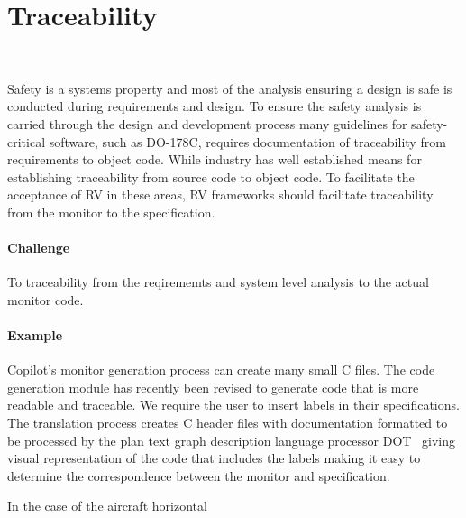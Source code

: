 \section{Traceability}~\label{sec:trace}

Safety is a systems property and most of the analysis ensuring a
design is safe is conducted during requirements and design.  To ensure
the safety analysis is carried through the design and development
process many guidelines for safety-critical software, such as DO-178C,
requires documentation of traceability from requirements to object
code. While industry has well established means for establishing
traceability from source code to object code.  To facilitate the
acceptance of RV in these areas, RV frameworks should facilitate
traceability from the monitor to the specification.

 \paragraph{Challenge} 
To  traceability from the reqirememts and system level analysis to the actual monitor code. 

\paragraph{Example} Copilot's monitor generation process can create many small C
files. The code generation module has recently been revised to
generate code that is more readable and traceable.  We require the
user to insert labels in their specifications. The translation process
creates C header files with documentation formatted to be processed by
the plan text graph description language processor  DOT~\cite{ZZZZ}
giving  visual representation of the code  that includes the labels
making it easy to determine the correspondence between the monitor and 
specification. 


In the case of the aircraft horizontal 



